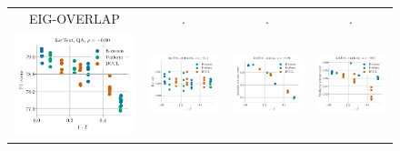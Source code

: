 \begin{figure}
	\centering
	\begin{tabular}{@{\hskip -0.0in}c@{\hskip -0.0in}c@{\hskip -0.0in}c@{\hskip -0.0in}c@{\hskip -0.0in}}
		EIG-OVERLAP & . & . & . \\
		\includegraphics[width=.245\linewidth]{figures/fasttext1m_qa_best-f1_vs_subspace-eig-overlap_linx.pdf} &
		\includegraphics[width=.245\linewidth]{figures/fasttext1m_sentiment_trec_test-acc_vs_subspace-eig-overlap_linx.pdf} &
		\includegraphics[width=.245\linewidth]{figures/fasttext1m_intrinsics_analogy-avg-score_vs_subspace-eig-overlap_linx.pdf} &
		\includegraphics[width=.245\linewidth]{figures/fasttext1m_intrinsics_similarity-avg-score_vs_subspace-eig-overlap_linx.pdf} \\
		

\end{tabular}
\end{figure}
